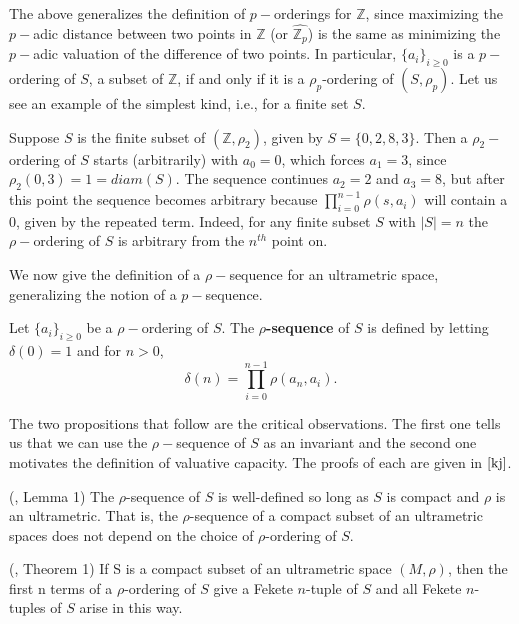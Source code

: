 The above generalizes the definition of $p-$orderings for $\mathbb{Z}$, since maximizing the $p-$adic distance between two points in $\mathbb{Z}$ (or $\widehat{\mathbb{Z}_p}$) is the same as minimizing the $p-$adic valuation of the difference of two points. In particular, $\{a_i\}_{i \geq 0}$ is a $p-$ordering of $S$, a subset of $\mathbb{Z}$, if and only if it is a $\rho_p$-ordering of $(S, \rho_p)$. Let us see an example of the simplest kind, i.e., for a finite set $S$.\\

\begin{example}
Suppose $S$ is the finite subset of $(\mathbb{Z}, \rho_2)$, given by $S=\{0,2,8,3\}$. Then a $\rho_2-$ordering of $S$ starts (arbitrarily) with $a_0=0$, which forces $a_1=3$, since $\rho_2(0,3)=1=diam(S)$. The sequence continues $a_2=2$ and $a_3=8$, but after this point the sequence becomes arbitrary because  $\prod_{i=0}^{n-1} \rho(s,a_i)$ will contain a $0$, given by the repeated term. Indeed, for any finite subset $S$ with $\lvert S \rvert = n$ the $\rho-$ordering of $S$ is arbitrary from the $n^{th}$ point on. 
\end{example}

We now give the definition of a $\rho-$sequence for an ultrametric space, generalizing the notion of a $p-$sequence.\\

\begin{definition}
	\cite{kj} Let $\{a_i\}_{i \geq 0}$ be a $\rho-$ordering of $S$. The \textbf{$\rho$-sequence} of $S$ is defined by letting $\delta(0)=1$  and for $n > 0$, \[\delta(n)=\prod_{i=0}^{n-1} \rho(a_n,a_i).\]
\end{definition}

The two propositions that follow are the critical observations. The first one tells us that we can use the $\rho-$sequence of $S$ as an invariant and the second one motivates the definition of valuative capacity. The proofs of each are given in $\cite{kj}$.\\

\begin{proposition}
	(\cite{kj}, Lemma 1) The $\rho$-sequence of $S$ is well-defined so long as $S$ is compact and $\rho$ is an ultrametric. That is, the $\rho$-sequence of a compact subset of an ultrametric spaces does not depend on the choice of $\rho$-ordering of $S$.
\end{proposition}

\begin{proposition} (\cite{kj}, Theorem 1)
If S is a compact subset of an ultrametric space $(M, \rho)$, then the first n terms of a $\rho$-ordering of $S$ give a Fekete $n$-tuple of $S$ and all Fekete $n$-tuples of $S$ arise in this way.
\end{proposition}

